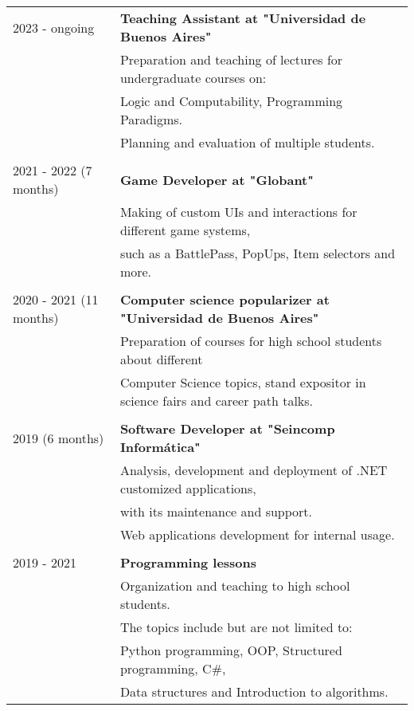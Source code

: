 \documentclass{article}
\begin{document}
\begin{tabular}{l | l}
    2023 - ongoing  & \textbf{Teaching Assistant at "Universidad de Buenos Aires"} \\
                            & Preparation and teaching of lectures for undergraduate courses on: \\
                            & Logic and Computability, Programming Paradigms. \\ 
                            & Planning and evaluation of multiple students. \\
                            \\
    2021 - 2022 (7 months) & \textbf{Game Developer at "Globant"} \\
                            & Making of custom UIs and interactions for different game systems, \\
                            & such as a BattlePass, PopUps, Item selectors and more. \\
                            \\
    2020 - 2021 (11 months) & \textbf{Computer science popularizer at "Universidad de Buenos Aires"} \\
                            & Preparation of courses for high school students about different \\ 
                            & Computer Science topics, stand expositor in science fairs and career path talks. \\
                            \\
    2019 (6 months) & \textbf{Software Developer at "Seincomp Informática"} \\
                    &  Analysis, development and deployment of .NET customized applications, \\ 
                    & with its maintenance and support. \\
                    & Web applications development for internal usage.\\
                    \\
    2019 - 2021     & \textbf{Programming lessons}  \\
                    & Organization and teaching to high school students. \\
                    & The topics include but are not limited to: \\ 
                    & Python programming, OOP, Structured programming, C\#, \\ 
                    & Data structures and Introduction to algorithms.
\end{tabular}
\end{document}
